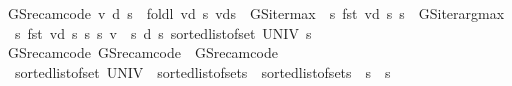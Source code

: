 \begin{isabellebody}
\ {\isachardoublequoteopen}GS{\isacharunderscore}{\kern0pt}rec{\isacharunderscore}{\kern0pt}am{\isacharunderscore}{\kern0pt}code{\isacharprime}{\kern0pt}\ v\ d\ s\ {\isacharequal}{\kern0pt}\ foldl\ {\isacharparenleft}{\kern0pt}{\isasymlambda}vd\ s{\isachardot}{\kern0pt}\ vd{\isacharparenleft}{\kern0pt}s\ {\isacharcolon}{\kern0pt}{\isacharequal}{\kern0pt}\ {\isacharparenleft}{\kern0pt}GS{\isacharunderscore}{\kern0pt}iter{\isacharunderscore}{\kern0pt}max\ {\isacharparenleft}{\kern0pt}{\isasymchi}\ s{\isachardot}{\kern0pt}\ fst\ {\isacharparenleft}{\kern0pt}vd\ s{\isacharparenright}{\kern0pt}{\isacharparenright}{\kern0pt}\ s{\isacharcomma}{\kern0pt}\ \ GS{\isacharunderscore}{\kern0pt}iter{\isacharunderscore}{\kern0pt}arg{\isacharunderscore}{\kern0pt}max\ {\isacharparenleft}{\kern0pt}{\isasymchi}\ s{\isachardot}{\kern0pt}\ fst\ {\isacharparenleft}{\kern0pt}vd\ s{\isacharparenright}{\kern0pt}{\isacharparenright}{\kern0pt}\ s{\isacharparenright}{\kern0pt}{\isacharparenright}{\kern0pt}{\isacharparenright}{\kern0pt}\ {\isacharparenleft}{\kern0pt}{\isasymlambda}s{\isachardot}{\kern0pt}\ {\isacharparenleft}{\kern0pt}v\ {\isachardollar}{\kern0pt}\ s{\isacharcomma}{\kern0pt}\ d\ s{\isacharparenright}{\kern0pt}{\isacharparenright}{\kern0pt}\ {\isacharparenleft}{\kern0pt}sorted{\isacharunderscore}{\kern0pt}list{\isacharunderscore}{\kern0pt}of{\isacharunderscore}{\kern0pt}set\ UNIV{\isacharparenright}{\kern0pt}\ s{\isachardoublequoteclose}\isanewline
\isanewline
{}\isamarkupfalse%
\ GS{\isacharunderscore}{\kern0pt}rec{\isacharunderscore}{\kern0pt}am{\isacharunderscore}{\kern0pt}code{\isacharprime}{\kern0pt}{\isacharcolon}{\kern0pt}\ {\isachardoublequoteopen}GS{\isacharunderscore}{\kern0pt}rec{\isacharunderscore}{\kern0pt}am{\isacharunderscore}{\kern0pt}code\ {\isacharequal}{\kern0pt}\ GS{\isacharunderscore}{\kern0pt}rec{\isacharunderscore}{\kern0pt}am{\isacharunderscore}{\kern0pt}code{\isacharprime}{\kern0pt}{\isachardoublequoteclose}\isanewline
%
\isadelimproof
%
\endisadelimproof
%
\isatagproof
{}\isamarkupfalse%
\ {\isacharminus}{\kern0pt}\isanewline
\ \ \isamarkupfalse%
\ {\isacharasterisk}{\kern0pt}{\isacharcolon}{\kern0pt}\ {\isachardoublequoteopen}sorted{\isacharunderscore}{\kern0pt}list{\isacharunderscore}{\kern0pt}of{\isacharunderscore}{\kern0pt}set\ UNIV\ {\isacharequal}{\kern0pt}\ sorted{\isacharunderscore}{\kern0pt}list{\isacharunderscore}{\kern0pt}of{\isacharunderscore}{\kern0pt}set{\isacharbraceleft}{\kern0pt}{\isachardot}{\kern0pt}{\isachardot}{\kern0pt}s{\isacharbraceright}{\kern0pt}\ {\isacharat}{\kern0pt}\ sorted{\isacharunderscore}{\kern0pt}list{\isacharunderscore}{\kern0pt}of{\isacharunderscore}{\kern0pt}set{\isacharbraceleft}{\kern0pt}s{\isacharless}{\kern0pt}{\isachardot}{\kern0pt}{\isachardot}{\kern0pt}{\isacharbraceright}{\kern0pt}{\isachardoublequoteclose}\ \ s\ {\isacharcolon}{\kern0pt}{\isacharcolon}{\kern0pt}\ {\isacharprime}{\kern0pt}s\isanewline

\end{isabellebody}
